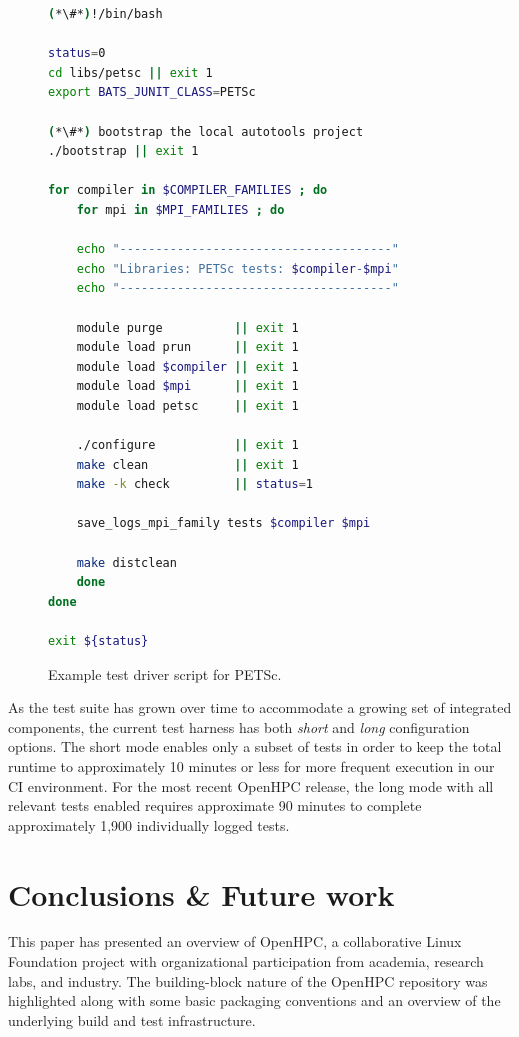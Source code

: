 \documentclass{sig-alternate-05-2015}
\begin{document}
\begin{figure}[t]
\begin{lstlisting}[language=bash,keywords={},keepspaces]
(*\#*)!/bin/bash

status=0
cd libs/petsc || exit 1
export BATS_JUNIT_CLASS=PETSc

(*\#*) bootstrap the local autotools project
./bootstrap || exit 1

for compiler in $COMPILER_FAMILIES ; do
    for mpi in $MPI_FAMILIES ; do

    echo "--------------------------------------"
    echo "Libraries: PETSc tests: $compiler-$mpi"
    echo "--------------------------------------"

    module purge          || exit 1
    module load prun      || exit 1
    module load $compiler || exit 1
    module load $mpi      || exit 1
    module load petsc     || exit 1

    ./configure           || exit 1
    make clean            || exit 1
    make -k check         || status=1

    save_logs_mpi_family tests $compiler $mpi

    make distclean
    done
done

exit ${status}
\end{lstlisting}
\vspace*{-0.3cm}
\caption{Example test driver script for PETSc.}
\label{fig:test_loop}
\end{figure}

As the test suite has grown over time to accommodate a growing set of integrated
components, the current test harness has both {\em short} and {\em long}
configuration options.  The short mode enables only a subset of tests in order
to keep the total runtime to approximately 10 minutes or less for more frequent
execution in our CI environment. For the most recent OpenHPC release, the long
mode with all relevant tests enabled requires approximate 90 minutes to complete
approximately 1,900 individually logged tests.


\section{Conclusions \& Future work}
This paper has presented an overview of OpenHPC, a collaborative Linux
Foundation project with organizational participation from academia, research
labs, and industry. The building-block nature of the OpenHPC repository was
highlighted along with some basic packaging conventions and an overview of the
underlying build and test infrastructure.
\end{document}

